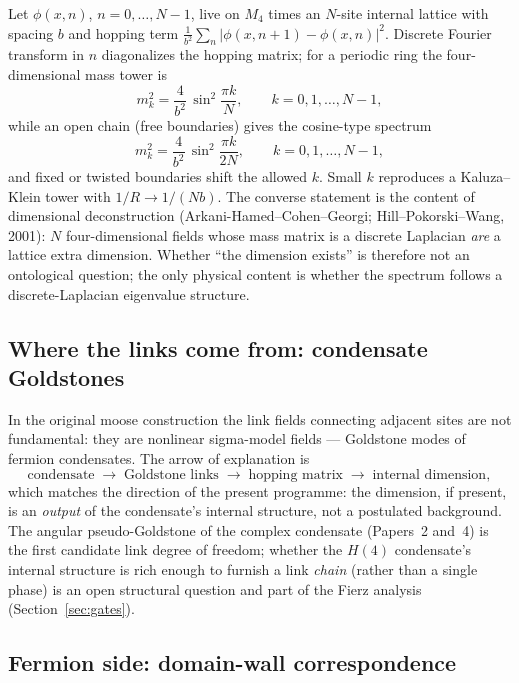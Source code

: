 \documentclass[11pt,a4paper]{article}
\begin{document}
Let $\phi(x,n)$, $n = 0,\dots,N-1$, live on $M_4$ times an
$N$-site internal lattice with spacing $b$ and hopping term
$\frac{1}{b^2}\sum_n |\phi(x,n{+}1)-\phi(x,n)|^2$.
Discrete Fourier transform in $n$ diagonalizes the hopping matrix;
for a periodic ring the four-dimensional mass tower is
\begin{equation}
m_k^2 = \frac{4}{b^2}\,\sin^2\!\frac{\pi k}{N},
\qquad k = 0,1,\dots,N-1,
\label{eq:ring}
\end{equation}
while an open chain (free boundaries) gives the cosine-type
spectrum
\begin{equation}
m_k^2 = \frac{4}{b^2}\,\sin^2\!\frac{\pi k}{2N},
\qquad k = 0,1,\dots,N-1,
\label{eq:chain}
\end{equation}
and fixed or twisted boundaries shift the allowed $k$.
Small $k$ reproduces a Kaluza--Klein tower with
$1/R \to 1/(Nb)$.
The converse statement is the content of dimensional
deconstruction (Arkani-Hamed--Cohen--Georgi; Hill--Pokorski--Wang,
2001): $N$ four-dimensional fields whose mass matrix is a discrete
Laplacian \emph{are} a lattice extra dimension.
Whether ``the dimension exists'' is therefore not an ontological
question; the only physical content is whether the spectrum
follows a discrete-Laplacian eigenvalue structure.

\subsection{Where the links come from: condensate Goldstones}

In the original moose construction the link fields connecting
adjacent sites are not fundamental: they are nonlinear
sigma-model fields --- Goldstone modes of fermion condensates.
The arrow of explanation is
\begin{equation}
\text{condensate} \;\to\; \text{Goldstone links} \;\to\;
\text{hopping matrix} \;\to\; \text{internal dimension},
\label{eq:arrow}
\end{equation}
which matches the direction of the present programme: the
dimension, if present, is an \emph{output} of the condensate's
internal structure, not a postulated background.
The angular pseudo-Goldstone of the complex condensate
(Papers~2 and~4) is the first candidate link degree of freedom;
whether the $H(4)$ condensate's internal structure is rich enough
to furnish a link \emph{chain} (rather than a single phase) is an
open structural question and part of the Fierz analysis
(Section~\ref{sec:gates}).

\subsection{Fermion side: domain-wall correspondence}
\end{document}
